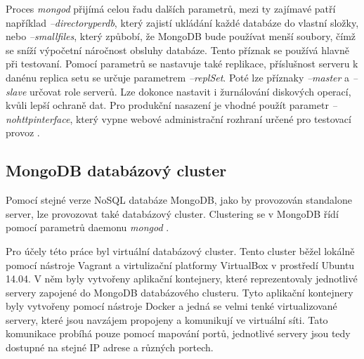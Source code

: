 Proces \emph{mongod} přijímá celou řadu dalších parametrů, mezi ty zajímavé patří například \emph{--directoryperdb}, který zajistí ukládání každé databáze do vlastní složky, nebo \emph{--smallfiles}, který způbobí, že MongoDB bude používat menší soubory, čímž se sníží výpočetní náročnost obsluhy databáze. Tento příznak se používá hlavně při testovaní. Pomocí parametrů se nastavuje také replikace, příslušnost serveru k danénu replica setu se určuje parametrem \emph{--replSet}. Poté lze příznaky \emph{--master} a \emph{--slave} určovat role serverů. Lze dokonce nastavit i žurnálování diskových operací, kvůli lepší ochraně dat. Pro produkční nasazení je vhodné použít parametr \emph{--nohttpinterface}, který vypne webové administrační rozhraní určené pro testovací provoz \cite{mongod}. 

\subsection{MongoDB databázový cluster}
Pomocí stejné verze NoSQL databáze MongoDB, jako by provozován standalone server, lze provozovat také databázový cluster. Clustering se v MongoDB řídí pomocí parametrů daemonu \emph{mongod} \cite{mongod}.  

Pro účely této práce byl virtuální databázový cluster. Tento cluster běžel lokálně pomocí nástroje Vagrant a virtulizační platformy VirtualBox v prostředí Ubuntu 14.04. V něm byly vytvořeny aplikační kontejnery, které reprezentovaly jednotlivé servery zapojené do MongoDB databázového clusteru. Tyto aplikační kontejnery byly vytvořeny pomocí nástroje Docker a jedná se velmi tenké virtualizované servery, které jsou navzájem propojeny a komunikují ve virtuální síti. Tato komunikace probíhá pouze pomocí mapování portů, jednotlivé servery jsou tedy dostupné na stejné IP adrese a různých portech.

